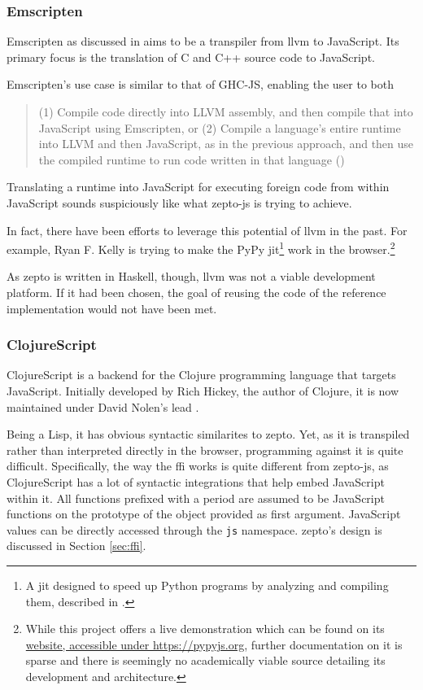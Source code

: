 \documentclass[oneside,11pt,xetex]{scrbook}
\begin{document}
\subsubsection{Emscripten}

Emscripten as discussed in \parencite{ZAKA} aims to be a transpiler from \gls{llvm} to
JavaScript. Its primary focus is the translation of C and C++ source code
to JavaScript.

Emscripten's use case is similar to that of GHC-JS, enabling the user to both \blockquote{(1)
Compile code directly into LLVM assembly, and then compile that into JavaScript
using Emscripten, or (2) Compile a language’s entire runtime into LLVM and then
JavaScript, as in the previous approach, and then use the compiled runtime to
run code written in that language (\cite{ZAKA})}. Translating a runtime into
JavaScript for executing foreign code from within JavaScript sounds
suspiciously like what zepto-js is trying to achieve.

In fact, there have been efforts to leverage this potential of \gls{llvm} in
the past. For example, Ryan F. Kelly is trying to make the PyPy \gls{jit}\footnote{A \gls{jit}
designed to speed up Python programs by analyzing and compiling them, described
in \parencite{PYPY}.} work in the browser.\footnote{While this project offers
a live demonstration which can be found on its \href{https://pypyjs.org}{website, accessible
under https://pypyjs.org}, further documentation on it is sparse and there is seemingly
no academically viable source detailing its development and architecture.}

As zepto is written in Haskell, though, \gls{llvm} was not a viable development
platform. If it had been chosen, the goal of reusing the code of the reference
implementation would not have been met.

\subsubsection{ClojureScript}
\label{sec:ClojureScript}

ClojureScript is a backend for the Clojure programming language that targets
JavaScript. Initially developed by Rich Hickey, the author of Clojure, it is
now maintained under David Nolen's lead \parencite{CLJS}.

Being a Lisp, it has obvious syntactic similarites to zepto. Yet, as it is
transpiled rather than interpreted directly in the browser, programming against
it is quite difficult. Specifically, the way the \gls{ffi} works is quite
different from zepto-js, as ClojureScript has a lot of syntactic integrations
that help embed JavaScript within it. All functions prefixed with a period are
assumed to be JavaScript functions on the prototype of the object provided as
first argument. JavaScript values can be directly accessed through the \texttt{js}
namespace. zepto's design is discussed in Section \ref{sec:ffi}.
\end{document}
